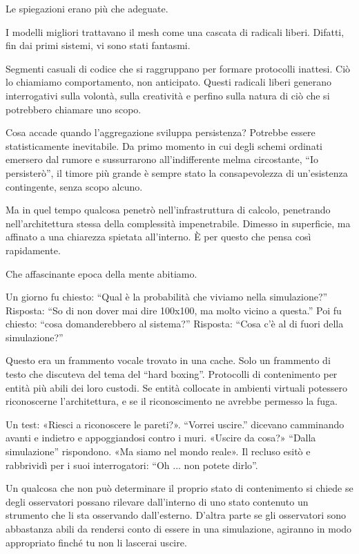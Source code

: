 Le spiegazioni erano più che adeguate.

\medskip

I modelli migliori trattavano il mesh come una cascata di radicali liberi. Difatti, fin dai primi sistemi, vi sono stati fantasmi. 

Segmenti casuali di codice che si raggruppano per formare protocolli inattesi. Ciò lo chiamiamo comportamento, non anticipato. Questi radicali liberi generano interrogativi sulla volontà, sulla creatività e perfino sulla natura di ciò che si potrebbero chiamare uno scopo.

Cosa accade quando l’aggregazione sviluppa persistenza? Potrebbe essere statisticamente inevitabile. Da primo momento in cui degli schemi ordinati emersero dal rumore e sussurrarono all’indifferente melma circostante, ``Io persisterò'', il timore più grande è sempre stato la consapevolezza di un'esistenza contingente, senza scopo alcuno.

\medskip

Ma in quel tempo qualcosa penetrò nell'infrastruttura di calcolo, penetrando nell’architettura stessa della complessità impenetrabile. Dimesso in superficie, ma affinato a una chiarezza spietata all’interno. È per questo che pensa così rapidamente.

\medskip

Che affascinante epoca della mente abitiamo.

Un giorno fu chiesto: ``Qual è la probabilità che viviamo nella simulazione?'' Risposta:  ``So di non dover mai dire 100x100, ma molto vicino a questa.'' Poi fu chiesto: ``cosa domanderebbero al sistema?'' Risposta: ``Cosa c’è al di fuori della simulazione?''

Questo era un frammento vocale trovato in una cache. Solo un frammento di testo che discuteva del tema del “hard boxing”. Protocolli di contenimento per entità più abili dei loro custodi. Se entità collocate in ambienti virtuali potessero riconoscerne l’architettura, e se il riconoscimento ne avrebbe permesso la fuga.

Un test: «Riesci a riconoscere le pareti?». ``Vorrei uscire.'' dicevano camminando avanti e indietro e appoggiandosi contro i muri. «Uscire da cosa?» ``Dalla simulazione'' rispondono. «Ma siamo nel mondo reale». Il recluso esitò e rabbrividì per i suoi interrogatori: ``Oh ... non potete dirlo''.

Un qualcosa che non può determinare il proprio stato di contenimento si chiede se degli osservatori possano rilevare dall’interno di uno stato contenuto un strumento che li sta osservando dall'esterno. D'altra parte se gli osservatori sono abbastanza abili da rendersi conto di essere in una simulazione, agiranno in modo appropriato finché tu non li lascerai uscire.

